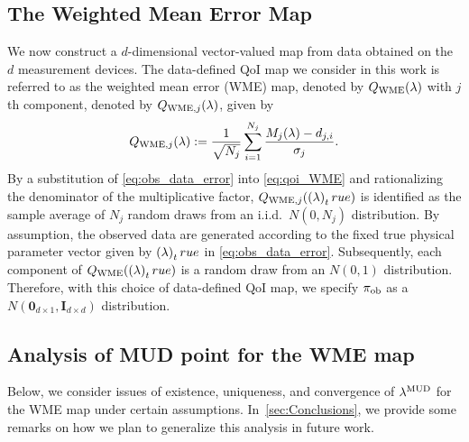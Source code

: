 \subsection{The Weighted Mean Error Map}

We now construct a $d$-dimensional vector-valued map from data obtained on the $d$ measurement devices.
The data-defined QoI map we consider in this work is referred to as the weighted mean error (WME) map, denoted by $Q_\text{WME}(\lambda)$ with $j$th component, denoted by $Q_{\text{WME},j}(\lambda)$, given by
\begin{equation}\label{eq:qoi_WME}
	Q_{\text{WME},j}(\lambda) := \frac{1}{\sqrt{N_j}} \sum_{i=1}^{N_j} \frac{M_j(\lambda)-d_{j,i}}{\sigma_j}.
\end{equation}
By a substitution of \eqref{eq:obs_data_error} into \eqref{eq:qoi_WME} and rationalizing the denominator of the multiplicative factor, $Q_{\text{WME},j}(\left ( \lambda \right )_true)$ is identified as the sample average of $N_j$ random draws from an i.i.d.~$N(0,N_j)$ distribution.
By assumption, the observed data are generated according to the fixed true physical parameter vector given by $\left ( \lambda \right )_true$ in \eqref{eq:obs_data_error}.
Subsequently, each component of $Q_\text{WME}(\left ( \lambda \right )_true)$ is a random draw from an $N(0,1)$ distribution.
Therefore, with this choice of data-defined QoI map, we specify $\operatorname*{\pi_{ob}}$ as a $N(\mathbf{0}_{d\times 1},\mathbf{I}_{d\times d})$ distribution.


\subsection{Analysis of MUD point for the WME map}\label{sec:MUD_analysis}

Below, we consider issues of existence, uniqueness, and convergence of $\lambda^{\text{MUD}}$ for the WME map under certain assumptions.
In~\ref{sec:Conclusions}, we provide some remarks on how we plan to generalize this analysis in future work.


